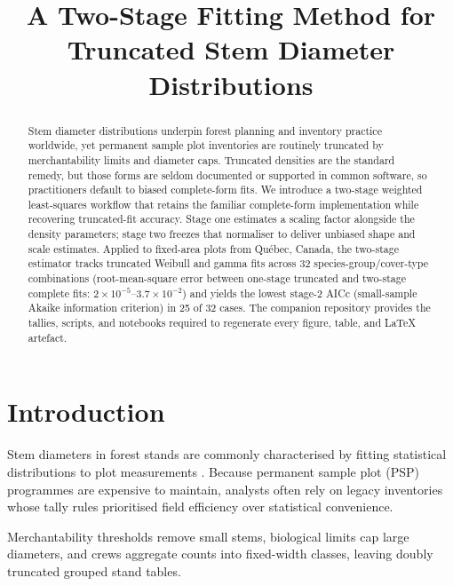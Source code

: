 \documentclass[12pt]{article}
\title{A Two-Stage Fitting Method for Truncated Stem Diameter Distributions}
\date{}
\begin{document}
\maketitle



\begin{abstract}
Stem diameter distributions underpin forest planning and inventory practice worldwide, yet permanent sample plot inventories are routinely truncated by merchantability limits and diameter caps. Truncated densities are the standard remedy, but those forms are seldom documented or supported in common software, so practitioners default to biased complete-form fits. We introduce a two-stage weighted least-squares workflow that retains the familiar complete-form implementation while recovering truncated-fit accuracy. Stage one estimates a scaling factor alongside the density parameters; stage two freezes that normaliser to deliver unbiased shape and scale estimates. Applied to fixed-area plots from Qu\'ebec, Canada, the two-stage estimator tracks truncated Weibull and gamma fits across 32 species-group/cover-type combinations (root-mean-square error between one-stage truncated and two-stage complete fits: $2\times10^{-5}$--$3.7\times10^{-2}$) and yields the lowest stage-2 AICc (small-sample Akaike information criterion) in 25 of 32 cases. The companion repository provides the tallies, scripts, and notebooks required to regenerate every figure, table, and \LaTeX{} artefact.
\end{abstract}

\section{Introduction}
\label{sec:introduction}

Stem diameters in forest stands are commonly characterised by fitting statistical distributions to plot measurements \citep{bailey1973quantifying, hyink1983generalized, gunn2000modeling, orellana2017fitting, orellana2017parameter}. Because permanent sample plot (PSP) programmes are expensive to maintain, analysts often rely on legacy inventories whose tally rules prioritised field efficiency over statistical convenience.

Merchantability thresholds remove small stems, biological limits cap large diameters, and crews aggregate counts into fixed-width classes, leaving doubly truncated grouped stand tables.
\end{document}

